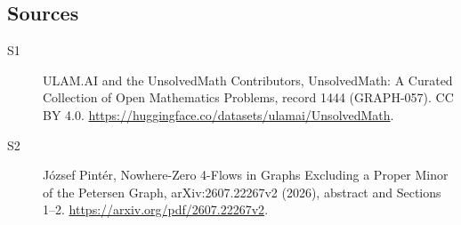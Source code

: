 \documentclass[11pt]{article}
\begin{document}
\subsection{Sources}
\begin{description}
\item[\hypertarget{source:1444:1}{S1}] ULAM.AI and the UnsolvedMath Contributors, UnsolvedMath: A Curated Collection of Open Mathematics Problems, record 1444 (GRAPH-057). CC BY 4.0. \url{https://huggingface.co/datasets/ulamai/UnsolvedMath}.
\item[\hypertarget{source:1444:2}{S2}] József Pintér, Nowhere-Zero 4-Flows in Graphs Excluding a Proper Minor of the Petersen Graph, arXiv:2607.22267v2 (2026), abstract and Sections 1--2. \url{https://arxiv.org/pdf/2607.22267v2}.
\end{description}
\label{end:1444}
\end{document}
